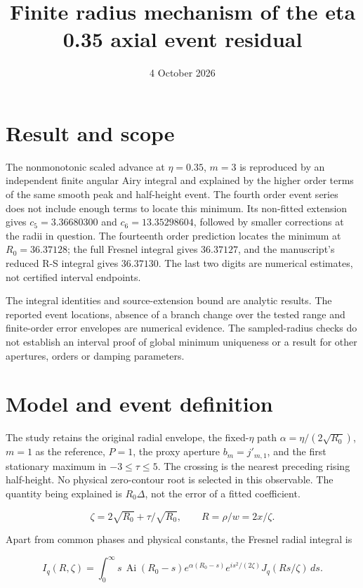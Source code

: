 \documentclass[11pt]{article}
\title{Finite radius mechanism of the eta 0.35 axial event residual}
\date{4 October 2026}
\begin{document}
\maketitle
\section{Result and scope}\label{result-and-scope}

The nonmonotonic scaled advance at \(\eta=0.35\), \(m=3\) is reproduced
by an independent finite angular Airy integral and explained by the
higher order terms of the same smooth peak and half-height event. The
fourth order event series does not include enough terms to locate this
minimum. Its non-fitted extension gives \(c_5=3.36680300\) and
\(c_6=13.35298604\), followed by smaller corrections at the radii in
question. The fourteenth order prediction locates the minimum at
\(R_0=36.37128\); the full Fresnel integral gives \(36.37127\), and the
manuscript's reduced R-S integral gives \(36.37130\). The last two
digits are numerical estimates, not certified interval endpoints.

The integral identities and
source-extension bound are analytic results. The reported event
locations, absence of a branch change over the tested range and
finite-order error envelopes are numerical evidence. The sampled-radius checks do not establish an interval proof of global
minimum uniqueness or a result for other apertures, orders or damping
parameters.

\section{Model and event definition}\label{model-and-event-definition}

The study retains the original radial envelope, the fixed-\(\eta\) path
\(\alpha=\eta/(2\sqrt{R_0})\), \(m=1\) as the reference, \(P=1\), the
proxy aperture \(b_m=j'_{m,1}\), and the first stationary maximum in
\(-3\leq\tau\leq5\). The crossing is the nearest preceding rising
half-height. No physical zero-contour root is selected in this
observable. The quantity being explained is \(R_0\Delta\), not the error
of a fitted coefficient.

\[\zeta=2\sqrt{R_0}+\tau/\sqrt{R_0},\qquad R=\rho/w=2x/\zeta.\]

Apart from common phases and physical constants, the Fresnel radial
integral is

\[I_q(R,\zeta)=\int_0^\infty s\,\operatorname{Ai}(R_0-s)e^{\alpha(R_0-s)}e^{is^2/(2\zeta)}J_q(Rs/\zeta)\,ds.\]
\end{document}
